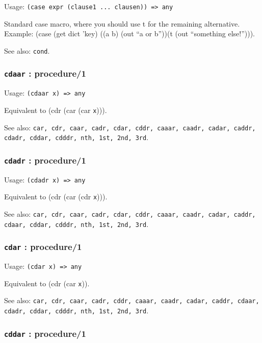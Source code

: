 \documentclass[
]{article}
\newcommand{\passthrough}[1]{#1}
\begin{document}
Usage:
\passthrough{\lstinline!(case expr (clause1 ... clausen)) => any!}

Standard case macro, where you should use t for the remaining
alternative. Example: (case (get dict 'key) ((a b) (out ``a or b''))(t
(out ``something else!''))).

See also: \passthrough{\lstinline!cond!}.

\hypertarget{cdaar-procedure1}{%
\subsubsection{\texorpdfstring{\texttt{cdaar} :
procedure/1}{cdaar : procedure/1}}\label{cdaar-procedure1}}

Usage: \passthrough{\lstinline!(cdaar x) => any!}

Equivalent to (cdr (car (car \passthrough{\lstinline!x!}))).

See also:
\passthrough{\lstinline!car, cdr, caar, cadr, cdar, cddr, caaar, caadr, cadar, caddr, cdadr, cddar, cdddr, nth, 1st, 2nd, 3rd!}.

\hypertarget{cdadr-procedure1}{%
\subsubsection{\texorpdfstring{\texttt{cdadr} :
procedure/1}{cdadr : procedure/1}}\label{cdadr-procedure1}}

Usage: \passthrough{\lstinline!(cdadr x) => any!}

Equivalent to (cdr (car (cdr \passthrough{\lstinline!x!}))).

See also:
\passthrough{\lstinline!car, cdr, caar, cadr, cdar, cddr, caaar, caadr, cadar, caddr, cdaar, cddar, cdddr, nth, 1st, 2nd, 3rd!}.

\hypertarget{cdar-procedure1}{%
\subsubsection{\texorpdfstring{\texttt{cdar} :
procedure/1}{cdar : procedure/1}}\label{cdar-procedure1}}

Usage: \passthrough{\lstinline!(cdar x) => any!}

Equivalent to (cdr (car \passthrough{\lstinline!x!})).

See also:
\passthrough{\lstinline!car, cdr, caar, cadr, cddr, caaar, caadr, cadar, caddr, cdaar, cdadr, cddar, cdddr, nth, 1st, 2nd, 3rd!}.

\hypertarget{cddar-procedure1}{%
\subsubsection{\texorpdfstring{\texttt{cddar} :
procedure/1}{cddar : procedure/1}}\label{cddar-procedure1}}
\end{document}
